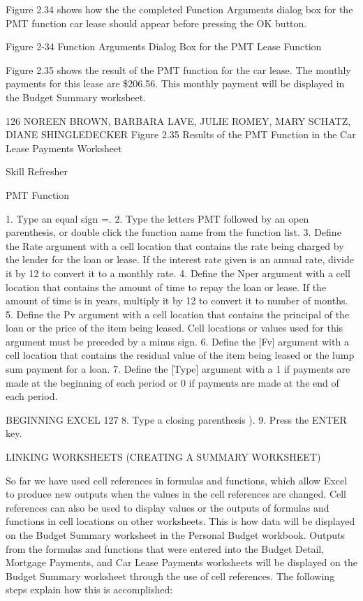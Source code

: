 Figure 2.34 shows how the the completed Function Arguments dialog box for the PMT function car
lease should appear before pressing the OK button.




Figure 2-34 Function Arguments Dialog Box for the PMT Lease Function


Figure 2.35 shows the result of the PMT function for the car lease. The monthly payments for this
lease are \$206.56. This monthly payment will be displayed in the Budget Summary worksheet.




126 NOREEN BROWN, BARBARA LAVE, JULIE ROMEY, MARY SCHATZ, DIANE SHINGLEDECKER
Figure 2.35 Results of the PMT Function in the Car Lease Payments Worksheet




Skill Refresher


PMT Function

1. Type an equal sign =.
2. Type the letters PMT followed by an open parenthesis, or double click the function name from the
function list.
3. Define the Rate argument with a cell location that contains the rate being charged by the lender for the
loan or lease. If the interest rate given is an annual rate, divide it by 12 to convert it to a monthly rate.
4. Define the Nper argument with a cell location that contains the amount of time to repay the loan or lease.
If the amount of time is in years, multiply it by 12 to convert it to number of months.
5. Define the Pv argument with a cell location that contains the principal of the loan or the price of the item
being leased. Cell locations or values used for this argument must be preceded by a minus sign.
6. Define the [Fv] argument with a cell location that contains the residual value of the item being leased or
the lump sum payment for a loan.
7. Define the [Type] argument with a 1 if payments are made at the beginning of each period or 0 if payments
are made at the end of each period.



BEGINNING EXCEL 127
8. Type a closing parenthesis ).
9. Press the ENTER key.



LINKING WORKSHEETS (CREATING A SUMMARY WORKSHEET)

So far we have used cell references in formulas and functions, which allow Excel to produce new
outputs when the values in the cell references are changed. Cell references can also be used to display
values or the outputs of formulas and functions in cell locations on other worksheets. This is how data
will be displayed on the Budget Summary worksheet in the Personal Budget workbook. Outputs
from the formulas and functions that were entered into the Budget Detail, Mortgage Payments,
and Car Lease Payments worksheets will be displayed on the Budget Summary worksheet through
the use of cell references. The following steps explain how this is accomplished:

